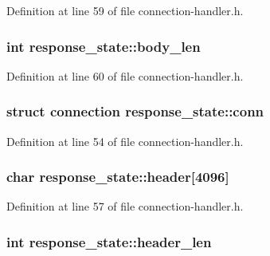 Definition at line 59 of file connection-\/handler.\-h.

\hypertarget{structresponse__state_afb8bdb798bbdbb28c0fe6a8854ee353c}{
\subsubsection[{body\-\_\-len}]{\setlength{\rightskip}{0pt plus 5cm}int response\-\_\-state\-::body\-\_\-len}}\label{structresponse__state_afb8bdb798bbdbb28c0fe6a8854ee353c}


Definition at line 60 of file connection-\/handler.\-h.

\hypertarget{structresponse__state_ac1ab399c44d920b03094a1f86b999cf2}{
\subsubsection[{conn}]{\setlength{\rightskip}{0pt plus 5cm}struct {\bf connection} response\-\_\-state\-::conn}}\label{structresponse__state_ac1ab399c44d920b03094a1f86b999cf2}


Definition at line 54 of file connection-\/handler.\-h.

\hypertarget{structresponse__state_a113400b7048467806cd387773c08a6ce}{
\subsubsection[{header}]{\setlength{\rightskip}{0pt plus 5cm}char response\-\_\-state\-::header\mbox{[}4096\mbox{]}}}\label{structresponse__state_a113400b7048467806cd387773c08a6ce}


Definition at line 57 of file connection-\/handler.\-h.

\hypertarget{structresponse__state_aa9c31e39cf92543b35d7dccd0008474a}{
\subsubsection[{header\-\_\-len}]{\setlength{\rightskip}{0pt plus 5cm}int response\-\_\-state\-::header\-\_\-len}}\label{structresponse__state_aa9c31e39cf92543b35d7dccd0008474a}


